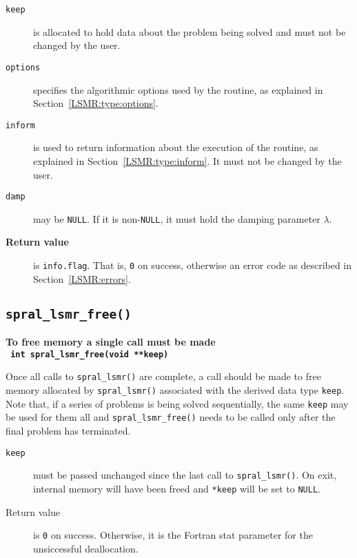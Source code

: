 \begin{description}
\item[\texttt{keep}] is allocated to hold data about the problem being
solved and must not be changed by the user.

\item[\texttt{options}] specifies the algorithmic options used by the routine,
as explained in Section~\ref{LSMR:type:options}.

\item[\texttt{inform}] is used to return information about the execution
of the routine, as explained in Section~\ref{LSMR:type:inform}.
It must not be changed by the user.

\item[\texttt{damp}] may be \texttt{NULL}. If it is non-\texttt{NULL}, it must
hold the damping parameter $\lambda$.

\item[\textbf{Return value}] is \texttt{info.flag}. That is,
\texttt{0} on success, otherwise an error code as described in
Section~\ref{LSMR:errors}.

\end{description}



\subsection{\texttt{spral\_lsmr\_free()}}
\textbf{To free memory a single call must be made
   \vspace{0.2cm}\\
    \texttt{ \hspace*{0.2cm}
      int spral\_lsmr\_free(void **keep)
   }
}
\vspace{0.2cm}

\noindent
Once all  calls to \texttt{spral\_lsmr()} are complete,
a call should be made to free memory  allocated by
\texttt{spral\_lsmr()}  associated with the derived data type {\tt keep}.
Note that, if a series of problems is being solved sequentially, the same {\tt keep}
may be used for them all and {\tt spral\_lsmr\_free()} needs to be called only
after the final problem has terminated.

\begin{description}

\item[\texttt{keep}] must be passed unchanged since the last call to \texttt{spral\_lsmr()}.
On exit, internal memory will have been freed and \texttt{*keep}
will be set to \texttt{NULL}.

\item[Return value] is \texttt{0} on success. Otherwise, it is the Fortran
stat parameter for the unsiccessful deallocation.

\end{description}



